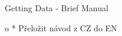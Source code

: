 \app Getting Data - Brief Manual

		\Green
		\begitems \style o
			* Přeložit návod z CZ do EN
		\enditems
		\Black

